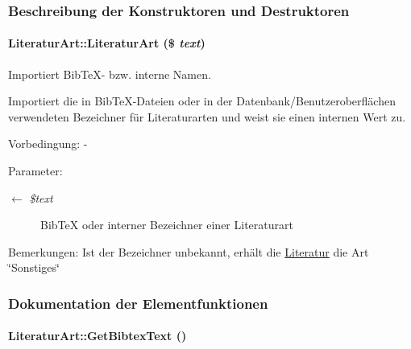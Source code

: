 \subsubsection{Beschreibung der Konstruktoren und Destruktoren}
\hypertarget{classLiteraturArt_b3312217430531ed7821a46a39c49af7}{
\paragraph[LiteraturArt]{\setlength{\rightskip}{0pt plus 5cm}Literatur\-Art::Literatur\-Art (\$ {\em text})}\hfill}
\label{classLiteraturArt_b3312217430531ed7821a46a39c49af7}


Importiert Bib\-Te\-X- bzw. interne Namen. 

Importiert die in Bib\-Te\-X-Dateien oder in der Datenbank/Benutzeroberflächen verwendeten Bezeichner für Literaturarten und weist sie einen internen Wert zu. \begin{Desc}
\item[Vorbedingung:]- \end{Desc}
\begin{Desc}
\item[Parameter:]
\begin{description}
\item[\mbox{$\leftarrow$} {\em \$text}]Bib\-Te\-X oder interner Bezeichner einer Literaturart \end{description}
\end{Desc}
\begin{Desc}
\item[Bemerkungen:]Ist der Bezeichner unbekannt, erhält die \hyperlink{classLiteratur}{Literatur} die Art \char`\"{}Sonstiges\char`\"{} \end{Desc}


\subsubsection{Dokumentation der Elementfunktionen}
\hypertarget{classLiteraturArt_01e1a2acd95df1ae0bb22e57b70a63de}{
\paragraph[GetBibtexText]{\setlength{\rightskip}{0pt plus 5cm}Literatur\-Art::Get\-Bibtex\-Text ()}\hfill}
\label{classLiteraturArt_01e1a2acd95df1ae0bb22e57b70a63de}



